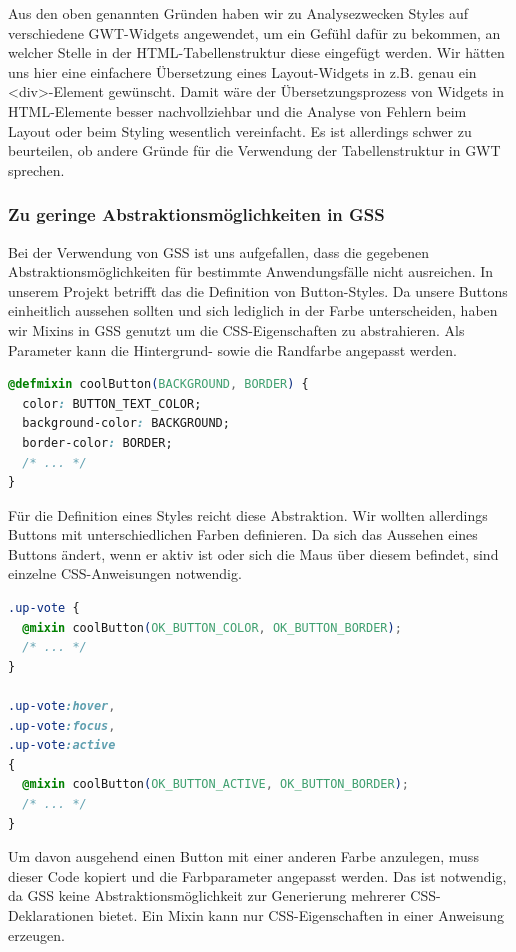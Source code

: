 Aus den oben genannten Gründen haben wir zu Analysezwecken Styles auf verschiedene GWT-Widgets angewendet,
um ein Gefühl dafür zu bekommen, an welcher Stelle in der HTML-Tabellenstruktur diese eingefügt werden.
Wir hätten uns hier eine einfachere Übersetzung eines Layout-Widgets in z.B. genau ein <div>-Element gewünscht.
Damit wäre der Übersetzungsprozess von Widgets in HTML-Elemente besser nachvollziehbar 
und die Analyse von Fehlern beim Layout oder beim Styling wesentlich vereinfacht.
Es ist allerdings schwer zu beurteilen, ob andere Gründe für die Verwendung der Tabellenstruktur in GWT sprechen.
 
\subsubsection{Zu geringe Abstraktionsmöglichkeiten in GSS}

Bei der Verwendung von GSS ist uns aufgefallen, dass die gegebenen Abstraktionsmöglichkeiten
für bestimmte Anwendungsfälle nicht ausreichen. In unserem Projekt betrifft das die Definition
von Button-Styles.
Da unsere Buttons einheitlich aussehen sollten und sich lediglich in der Farbe unterscheiden, 
haben wir Mixins in GSS genutzt um die CSS-Eigenschaften zu abstrahieren. Als Parameter kann
die Hintergrund- sowie die Randfarbe angepasst werden.

\begin{lstlisting}[language=CSS]
@defmixin coolButton(BACKGROUND, BORDER) {
  color: BUTTON_TEXT_COLOR; 
  background-color: BACKGROUND; 
  border-color: BORDER; 
  /* ... */
}
\end{lstlisting}

Für die Definition eines Styles reicht diese Abstraktion. Wir wollten allerdings Buttons mit unterschiedlichen Farben definieren. Da sich das Aussehen eines Buttons ändert, wenn er aktiv ist oder sich
die Maus über diesem befindet, sind einzelne CSS-Anweisungen notwendig.

\begin{lstlisting}[language=CSS]
.up-vote { 
  @mixin coolButton(OK_BUTTON_COLOR, OK_BUTTON_BORDER);
  /* ... */
} 

.up-vote:hover, 
.up-vote:focus, 
.up-vote:active
{ 
  @mixin coolButton(OK_BUTTON_ACTIVE, OK_BUTTON_BORDER);
  /* ... */
} 
\end{lstlisting}

Um davon ausgehend einen Button mit einer anderen Farbe anzulegen, muss dieser Code kopiert und
die Farbparameter angepasst werden.
Das ist notwendig, da GSS keine Abstraktionsmöglichkeit zur Generierung mehrerer CSS-Deklarationen
bietet. Ein Mixin kann nur CSS-Eigenschaften in einer Anweisung erzeugen.

